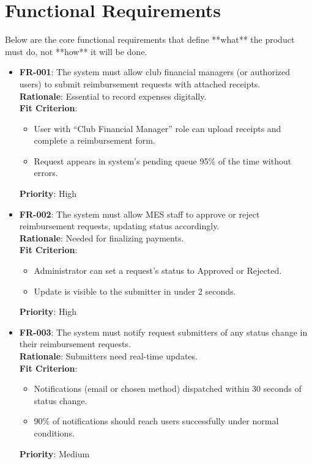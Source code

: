 \documentclass[12pt]{article}
\begin{document}
\section{Functional Requirements}
Below are the core functional requirements that define **what** the product must do, not **how** it will be done.

\begin{itemize}
  \item \textbf{FR-001}: The system must allow club financial managers (or authorized users) to submit reimbursement requests with attached receipts. \\
  \textbf{Rationale}: Essential to record expenses digitally. \\
  \textbf{Fit Criterion}:
    \begin{itemize}
      \item User with “Club Financial Manager” role can upload receipts and complete a reimbursement form.
      \item Request appears in system’s pending queue 95\% of the time without errors.
    \end{itemize}
  \textbf{Priority}: High

  \item \textbf{FR-002}: The system must allow MES staff to approve or reject reimbursement requests, updating status accordingly. \\
  \textbf{Rationale}: Needed for finalizing payments. \\
  \textbf{Fit Criterion}:
    \begin{itemize}
      \item Administrator can set a request’s status to Approved or Rejected.
      \item Update is visible to the submitter in under 2 seconds.
    \end{itemize}
  \textbf{Priority}: High

  \item \textbf{FR-003}: The system must notify request submitters of any status change in their reimbursement requests. \\
  \textbf{Rationale}: Submitters need real-time updates. \\
  \textbf{Fit Criterion}:
    \begin{itemize}
      \item Notifications (email or chosen method) dispatched within 30 seconds of status change.
      \item 90\% of notifications should reach users successfully under normal conditions.
    \end{itemize}
  \textbf{Priority}: Medium


\end{itemize}
\end{document}
